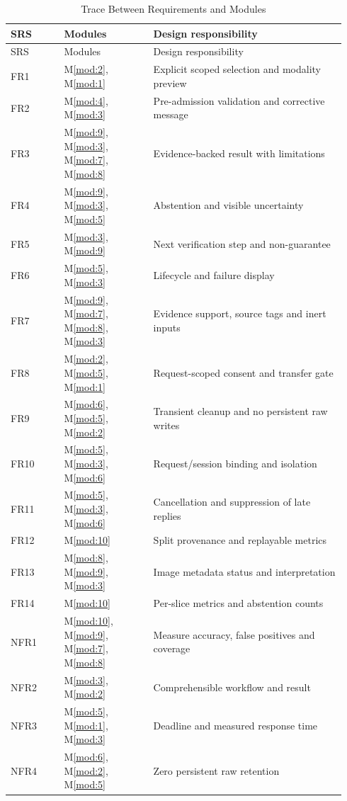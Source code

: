 \documentclass[12pt, titlepage]{article}
\newcommand{\mref}[1]{M\ref{#1}}
\newcommand{\modref}[1]{\mref{mod:#1}}
\begin{document}
\begin{longtable}{@{}p{0.15\linewidth}p{0.25\linewidth}p{0.54\linewidth}@{}}
\caption{Trace Between Requirements and Modules}\label{TblRT}\\
\toprule SRS & Modules & Design responsibility \\ \midrule
\endfirsthead
\toprule SRS & Modules & Design responsibility \\ \midrule
\endhead
FR1 & \modref{2}, \modref{1} & Explicit scoped selection and modality preview \\
FR2 & \modref{4}, \modref{3} & Pre-admission validation and corrective message \\
FR3 & \modref{9}, \modref{3}, \modref{7}, \modref{8} & Evidence-backed result with limitations \\
FR4 & \modref{9}, \modref{3}, \modref{5} & Abstention and visible uncertainty \\
FR5 & \modref{3}, \modref{9} & Next verification step and non-guarantee \\
FR6 & \modref{5}, \modref{3} & Lifecycle and failure display \\
FR7 & \modref{9}, \modref{7}, \modref{8}, \modref{3} & Evidence support, source tags and inert inputs \\
FR8 & \modref{2}, \modref{5}, \modref{1} & Request-scoped consent and transfer gate \\
FR9 & \modref{6}, \modref{5}, \modref{2} & Transient cleanup and no persistent raw writes \\
FR10 & \modref{5}, \modref{3}, \modref{6} & Request/session binding and isolation \\
FR11 & \modref{5}, \modref{3}, \modref{6} & Cancellation and suppression of late replies \\
FR12 & \modref{10} & Split provenance and replayable metrics \\
FR13 & \modref{8}, \modref{9}, \modref{3} & Image metadata status and interpretation \\
FR14 & \modref{10} & Per-slice metrics and abstention counts \\
NFR1 & \modref{10}, \modref{9}, \modref{7}, \modref{8} & Measure accuracy, false positives and coverage \\
NFR2 & \modref{3}, \modref{2} & Comprehensible workflow and result \\
NFR3 & \modref{5}, \modref{1}, \modref{3} & Deadline and measured response time \\
NFR4 & \modref{6}, \modref{2}, \modref{5} & Zero persistent raw retention \\

\end{longtable}
\end{document}
